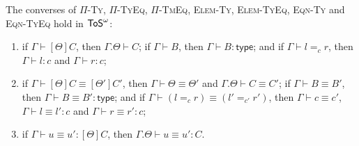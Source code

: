 \begin{proposition}[Inversion]\label{prop:inversion}
    The converses of \textup{\textsc{$\Pi$-Ty}}, \textup{\textsc{$\Pi$-TyEq}}, \textup{\textsc{$\Pi$-TmEq}}, \textup{\textsc{Elem-Ty}}, \textup{\textsc{Elem-TyEq}}, \textup{\textsc{Eqn-Ty}} and \textup{\textsc{Eqn-TyEq}} hold in $\mathsf{ToS}^\omega$:
    \begin{enumerate}
        \item if $\Gamma \vdash [\Theta]C$, then $\Gamma.\Theta \vdash C$; if $\Gamma \vdash B$, then $\Gamma \vdash B : \mathsf{type}$; and if $\Gamma \vdash l =_c r$, then $\Gamma \vdash l : c$ and $\Gamma \vdash r : c$;
        \item if $\Gamma \vdash [\Theta]C \equiv [\Theta']C'$, then $\Gamma \vdash \Theta \equiv \Theta'$ and $\Gamma.\Theta \vdash C \equiv C'$; if $\Gamma \vdash B \equiv B'$, then $\Gamma \vdash B \equiv B' : \mathsf{type}$; and if $\Gamma \vdash (l =_c r) \equiv (l' =_{c'} r')$, then $\Gamma \vdash c \equiv c'$, $\Gamma \vdash l \equiv l' : c$ and $\Gamma \vdash r \equiv r' : c$;
        \item if $\Gamma \vdash u \equiv u' : [\Theta]C$, then $\Gamma.\Theta \vdash u \equiv u' : C$.
    \end{enumerate}
\end{proposition}

